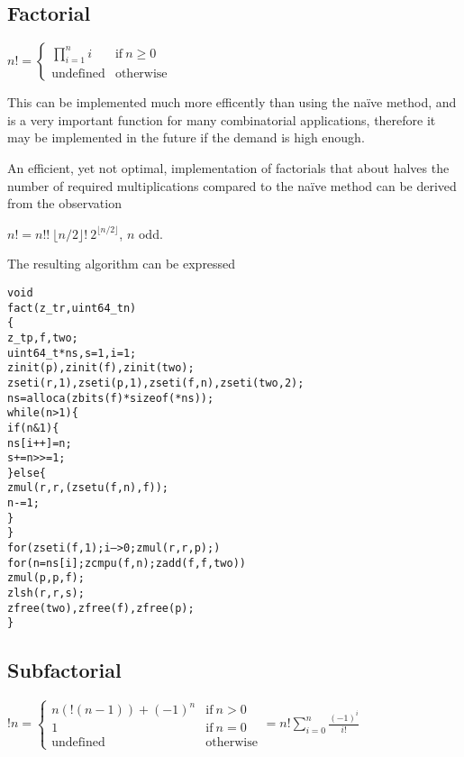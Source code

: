 \subsection{Factorial}
\label{sec:Factorial}

\( \displaystyle{
    n! = \left \lbrace \begin{array}{ll}
        \displaystyle{\prod_{i = 1}^n i} & \textrm{if}~ n \ge 0 \\
        \textrm{undefined} & \textrm{otherwise}
    \end{array} \right .
}\)
\vspace{1em}

This can be implemented much more efficently
than using the naïve method, and is a very
important function for many combinatorial
applications, therefore it may be implemented
in the future if the demand is high enough.

An efficient, yet not optimal, implementation
of factorials that about halves the number of
required multiplications compared to the naïve
method can be derived from the observation

\vspace{1em}
\( \displaystyle{
    n! = n!! ~ \lfloor n / 2 \rfloor! ~ 2^{\lfloor n / 2 \rfloor}
}\), $n$ odd.
\vspace{1em}

\noindent
The resulting algorithm can be expressed

\begin{alltt}
   void
   fact(z_t r, uint64_t n)
   \{
       z_t p, f, two;
       uint64_t *ns, s = 1, i = 1;
       zinit(p), zinit(f), zinit(two);
       zseti(r, 1), zseti(p, 1), zseti(f, n), zseti(two, 2);
       ns = alloca(zbits(f) * sizeof(*ns));
       while (n > 1) \{
           if (n & 1) \{
               ns[i++] = n;
               s += n >>= 1;
           \} else \{
               zmul(r, r, (zsetu(f, n), f));
               n -= 1;
           \}
       \}
       for (zseti(f, 1); i-- > 0; zmul(r, r, p);)
           for (n = ns[i]; zcmpu(f, n); zadd(f, f, two))
               zmul(p, p, f);
       zlsh(r, r, s);
       zfree(two), zfree(f), zfree(p);
   \}
\end{alltt}


\subsection{Subfactorial}
\label{sec:Subfactorial}

\( \displaystyle{
    !n = \left \lbrace \begin{array}{ll}
      n(!(n - 1)) + (-1)^n & \textrm{if}~ n > 0 \\
      1 & \textrm{if}~ n = 0 \\
      \textrm{undefined} & \textrm{otherwise}
    \end{array} \right . =
    n! \sum_{i = 0}^n \frac{(-1)^i}{i!}
}\)


